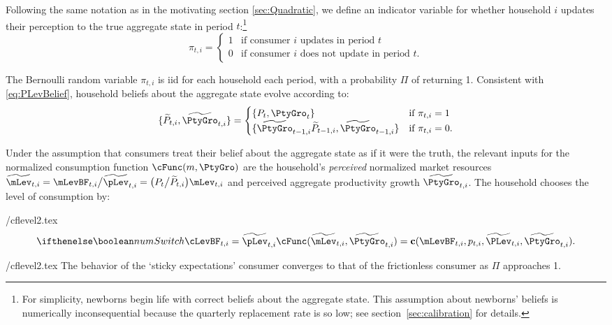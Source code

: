 Following the same notation as in the motivating section \ref{sec:Quadratic}, we define an indicator variable for whether household $i$ updates their perception to the true aggregate state in period $t$:\footnote{For simplicity, newborns begin life with correct beliefs about the aggregate state.  This assumption about newborns' beliefs is numerically inconsequential because the quarterly replacement rate is so low; see section~\ref{sec:calibration} for details.}
\begin{equation*}
  \pi_{t,i} =
  \begin{cases}
    1 & \text{if consumer $i$ updates in period $t$}
    \\ 0 & \text{if consumer $i$ does not update in period $t$}.
  \end{cases}
\end{equation*}

The Bernoulli random variable $\pi_{t,i}$ is iid for each household each period, with a probability $\Pi$ of returning 1.  Consistent with \eqref{eq:PLevBelief}, household beliefs about the aggregate state evolve according to:
\begin{equation}\label{eq:PLevBeliefSOE}
  \{\perc{P}_{t,i},\perc{\PtyGro}_{t,i}\} = \begin{cases}
    \{P_t, \PtyGro_t\} & \text{if } \pi_{t,i} = 1 \\
    \{\perc{\PtyGro}_{t-1,i} \perc{P}_{t-1,i} , \perc{\PtyGro}_{t-1,i} \} & \text{if } \pi_{t,i} = 0.
  \end{cases}
\end{equation}

Under the assumption that consumers treat their belief about the aggregate state as if it were the truth, the relevant inputs for the normalized consumption function $\cFunc(m,\PtyGro)$ are the household's \textit{perceived} normalized market resources $\perc{\mLev}_{t,i} = \mLevBF_{t,i}\big/\perc{\pLev}_{t,i} = \big(P_t\big/\perc{P}_{t,i}\big)\mLev_{t,i}$ and perceived aggregate productivity growth $\perc{\PtyGro}_{t,i}$.  The household chooses the level of consumption by:
\begin{verbatimwrite}{\eq/cflevel2.tex}
  \begin{equation*}
    \ifnumSw \cLevBF_{t,i} = \perc{\pLev}_{t,i} \cFunc(\perc{\mLev}_{t,i},\perc{\PtyGro}_{t,i}) = \cFuncLev(\mLevBF_{t,i}, p_{t,i}, \perc{\PLev}_{t,i}, \perc{\PtyGro}_{t,i}). \label{eq:cPerc}
  \end{equation*}
\end{verbatimwrite}
 {\eq/cflevel2.tex}
The behavior of the `sticky expectations' consumer converges to that of the frictionless consumer as $\Pi$ approaches 1.

